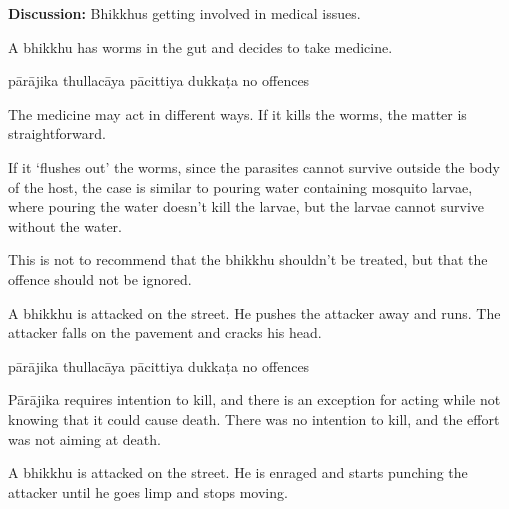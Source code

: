 \begin{exam}{\autoExamName}
\begin{problem*}
\begin{parts}
  \bigskip

  \textbf{Discussion:} Bhikkhus getting involved in medical issues.  

  \bigskip
  
  \item A bhikkhu has worms in the gut and decides to take medicine.

  \bigskip

  \begin{answers}{5}
    \bChoices
     pārājika\eAns
     thullacāya\eAns
     pācittiya\eAns
     dukkaṭa\eAns
     no offences\eAns
    \eChoices
  \end{answers}

  \begin{solution}
    The medicine may act in different ways. If it kills the worms, the matter is straightforward.

    If it `flushes out' the worms, since the parasites cannot survive outside the body of the host,
    the case is similar to pouring water containing mosquito larvae,
    where pouring the water doesn't kill the larvae,
    but the larvae cannot survive without the water.

    This is not to recommend that the bhikkhu shouldn't be treated,
    but that the offence should not be ignored.
  \end{solution}

  \item A bhikkhu is attacked on the street. He pushes the attacker away and runs. The
  attacker falls on the pavement and cracks his head.

  \bigskip

  \begin{answers}{5}
    \bChoices
     pārājika\eAns
     thullacāya\eAns
     pācittiya\eAns
     dukkaṭa\eAns
     no offences\eAns
    \eChoices
  \end{answers}

  \begin{solution}
    Pārājika requires intention to kill,
    and there is an exception for acting while not knowing that it could cause death.
    There was no intention to kill, and the effort was not aiming at death.
  \end{solution}

  \bigskip

  \item A bhikkhu is attacked on the street. He is enraged and starts punching the attacker
  until he goes limp and stops moving.


\end{parts}
\end{problem*}
\end{exam}
